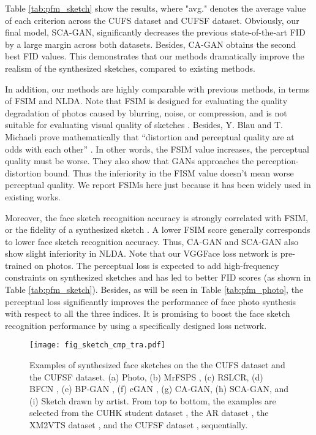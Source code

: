\documentclass[journal]{IEEEtran}
\begin{document}
Table \ref{tab:pfm_sketch} show the results, where "avg." denotes the average value of each criterion across the CUFS dataset and CUFSF dataset. Obviously, our final model, SCA-GAN, significantly decreases the previous state-of-the-art FID by a large margin across both datasets. Besides, CA-GAN obtains the second best FID values. This demonstrates that our methods dramatically improve the realism of the synthesized sketches, compared to existing methods. 

In addition, our methods are highly comparable with previous methods, in terms of FSIM and NLDA. Note that FSIM is designed for evaluating the quality degradation of photos caused by blurring, noise, or compression, and is not suitable for evaluating visual quality of sketches \cite{Wang2016Evaluation}. Besides, Y. Blau and T. Michaeli prove mathematically that “distortion and perceptual quality are at odds with each other” \cite{Blau_2018_CVPR}. In other words, the FSIM value increases, the perceptual quality must be worse. They also show that GANs approaches the perception-distortion bound. Thus the inferiority in the FISM value doesn't mean worse perceptual quality. We report FSIMs here just because it has been widely used in existing works. 

Moreover, the face sketch recognition accuracy is strongly correlated with FSIM, or the fidelity of a synthesized sketch \cite{wang2016training-free}. A lower FSIM score generally corresponds to lower face sketch recognition accuracy. Thus, CA-GAN and SCA-GAN also show slight inferiority in NLDA.
Note that our VGGFace loss network is pre-trained on photos. The perceptual loss is expected to add high-frequency constraints on synthesized sketches and has led to better FID scores (as shown in Table \ref{tab:pfm_sketch}). Besides, as will be seen in Table \ref{tab:pfm_photo}, the perceptual loss significantly improves the performance of face photo synthesis with respect to all the three indices. It is promising to boost the face sketch recognition performance by using a specifically designed loss network. 



\begin{figure}
\centering
\texttt{[image: fig\_sketch\_cmp\_tra.pdf]}
   \vspace{-0.8cm}
\caption{Examples of synthesized face sketches on the the CUFS dataset and the CUFSF dataset.
(a) Photo, (b) MrFSPS \cite{Peng2016Multiple}, (c) RSLCR\cite{Wang2017RSLCR}, (d) BFCN \cite{BFCN}, (e) BP-GAN \cite{wang2017bpgan}, (f) cGAN \cite{Isola2017Pix2Pix}, (g) CA-GAN, (h) SCA-GAN, and (i) Sketch drawn by artist. From top to bottom, the examples are selected from the CUHK student dataset \cite{Ref2}, the AR dataset \cite{Ref23}, the XM2VTS dataset \cite{Ref24}, and the CUFSF dataset \cite{Ref32}, sequentially.}
\label{fig:sketch_cmp_tra}
   \vspace{-0.4cm}
\end{figure}
\end{document}
